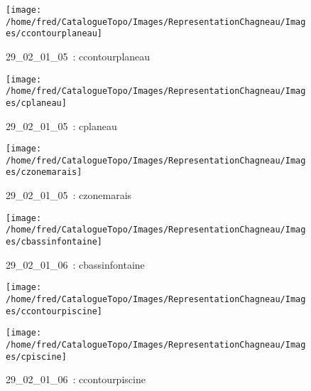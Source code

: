 \documentclass[12pt,titlepage]{book}
\begin{document}
\begin{figure}[h!]
\begin{minipage}[t]{3cm}
    \begin{center}
      \texttt{[image: /home/fred/CatalogueTopo/Images/RepresentationChagneau/Images/ccontourplaneau]}
      \caption[~29\_02\_01\_05]{\small{29\_02\_01\_05~:} \tiny{ccontourplaneau}}\label{ccontourplaneau}
    \end{center}
  \end{minipage}
  \begin{minipage}[t]{3cm}
    \begin{center}
      \texttt{[image: /home/fred/CatalogueTopo/Images/RepresentationChagneau/Images/cplaneau]}
      \caption[~29\_02\_01\_05]{\small{29\_02\_01\_05~:} \tiny{cplaneau}}\label{cplaneau}
    \end{center}
  \end{minipage}
  \begin{minipage}[t]{3cm}
    \begin{center}
      \texttt{[image: /home/fred/CatalogueTopo/Images/RepresentationChagneau/Images/czonemarais]}
      \caption[~29\_02\_01\_05]{\small{29\_02\_01\_05~:} \tiny{czonemarais}}\label{czonemarais}
    \end{center}
  \end{minipage}
  \begin{minipage}[t]{3cm}
    \begin{center}
      \texttt{[image: /home/fred/CatalogueTopo/Images/RepresentationChagneau/Images/cbassinfontaine]}
      \caption[~29\_02\_01\_06]{\small{29\_02\_01\_06~:} \tiny{cbassinfontaine}}\label{cbassinfontaine}
    \end{center}
  \end{minipage}
  \begin{minipage}[t]{3cm}
    \begin{center}
      \texttt{[image: /home/fred/CatalogueTopo/Images/RepresentationChagneau/Images/ccontourpiscine]}
      \caption[~29\_02\_01\_06]{\small{29\_02\_01\_06~:} \tiny{ccontourpiscine}}\label{ccontourpiscine}
    \end{center}
  \end{minipage}
  \begin{minipage}[t]{3cm}
    \begin{center}
      \texttt{[image: /home/fred/CatalogueTopo/Images/RepresentationChagneau/Images/cpiscine]}

\end{center}
\end{minipage}
\end{figure}
\end{document}
